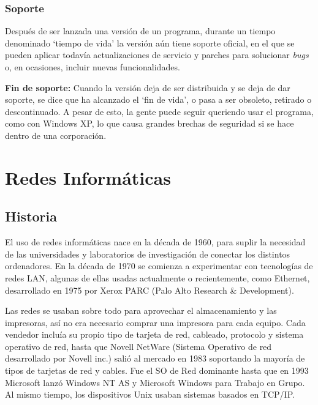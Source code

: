 \documentclass[a4paper, 11pt]{report} %
\begin{document}
\subsection{Soporte}
Después de ser lanzada una versión de un programa, durante un tiempo denominado `tiempo de vida' la versión aún tiene soporte oficial, en el que se pueden aplicar todavía actualizaciones de servicio y parches para solucionar \textit{bugs} o, en ocasiones, incluir nuevas funcionalidades.
\begin{description}
\item \textbf{Fin de soporte:} Cuando la versión deja de ser distribuida y se deja de dar soporte, se dice que ha alcanzado el `fin de vida', o pasa a ser obsoleto, retirado o descontinuado. A pesar de esto, la gente puede seguir queriendo usar el programa, como con Windows XP, lo que causa grandes brechas de seguridad si se hace dentro de una corporación.
\end{description}

\chapter{Redes Informáticas}
\section*{Historia}
El uso de redes informáticas nace en la década de 1960, para suplir la necesidad de las universidades y laboratorios de investigación de conectar los distintos ordenadores. En la década de 1970 se comienza a experimentar con tecnologías de redes LAN, algunas de ellas usadas actualmente o recientemente, como Ethernet, desarrollado en 1975 por Xerox PARC (Palo Alto Research \& Development). 

Las redes se usaban sobre todo para aprovechar el almacenamiento y las impresoras, así no era necesario comprar una impresora para cada equipo. Cada vendedor incluía su propio tipo de tarjeta de red, cableado, protocolo y sistema operativo de red, hasta que Novell NetWare (Sistema Operativo de red desarrollado por Novell inc.) salió al mercado en 1983 soportando la mayoría de tipos de tarjetas de red y cables. Fue el SO de Red dominante hasta que en 1993 Microsoft lanzó Windows NT AS y Microsoft Windows para Trabajo en Grupo. Al mismo tiempo, los dispositivos Unix usaban sistemas basados en TCP/IP.
\end{document}
